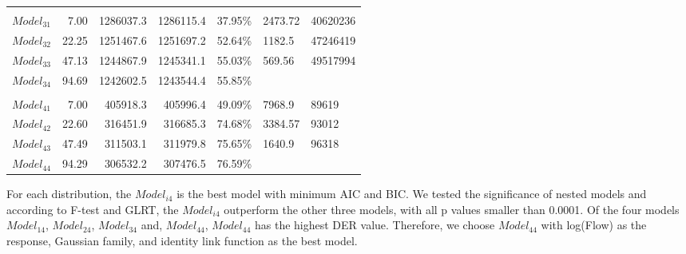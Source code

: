 \documentclass[12pt,oneside]{reedthesis}
\begin{document}
\begin{table}[!h]
\begin{tabular}[t]{lrrrlll}
\addlinespace[0.3em]
\multicolumn{7}{l}{\textbf{$Model_{3\cdot}$}}\\
\hspace{1em}$Model_{31}$ & 7.00 & 1286037.3 & 1286115.4 & 37.95\% & 2473.72 & 40620236\\
\hspace{1em}$Model_{32}$ & 22.25 & 1251467.6 & 1251697.2 & 52.64\% & 1182.5 & 47246419\\
\hspace{1em}$Model_{33}$ & 47.13 & 1244867.9 & 1245341.1 & 55.03\% & 569.56 & 49517994\\
\hspace{1em}$Model_{34}$ & 94.69 & 1242602.5 & 1243544.4 & 55.85\% &  & \\
\addlinespace[0.3em]
\multicolumn{7}{l}{\textbf{$Model_{4\cdot}$}}\\
\hspace{1em}$Model_{41}$ & 7.00 & 405918.3 & 405996.4 & 49.09\% & 7968.9 & 89619\\
\hspace{1em}$Model_{42}$ & 22.60 & 316451.9 & 316685.3 & 74.68\% & 3384.57 & 93012\\
\hspace{1em}$Model_{43}$ & 47.49 & 311503.1 & 311979.8 & 75.65\% & 1640.9 & 96318\\
\hspace{1em}$Model_{44}$ & 94.29 & 306532.2 & 307476.5 & 76.59\% &  & \\
\bottomrule
\end{tabular}
\end{table}
For each distribution, the \(Model_{i4}\) is the best model with minimum AIC and BIC. We tested the significance of nested models and according to F-test and GLRT, the \(Model_{i4}\) outperform the other three models, with all p values smaller than 0.0001. Of the four models \(Model_{14}\), \(Model_{24}\), \(Model_{34}\) and, \(Model_{44}\), \(Model_{44}\) has the highest DER value. Therefore, we choose \(Model_{44}\) with log(Flow) as the response, Gaussian family, and identity link function as the best model.
\end{document}
